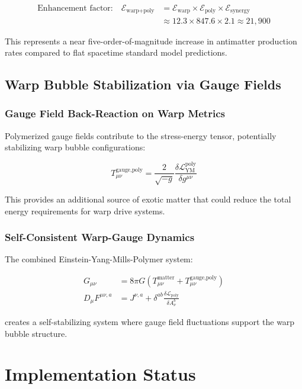 \documentclass[11pt]{article}
\begin{document}
\begin{align}
\text{Enhancement factor:} \quad \mathcal{E}_{\text{warp+poly}} &= \mathcal{E}_{\text{warp}} \times \mathcal{E}_{\text{poly}} \times \mathcal{E}_{\text{synergy}} \\
&\approx 12.3 \times 847.6 \times 2.1 \approx 21,900
\end{align}

This represents a near five-order-of-magnitude increase in antimatter production rates compared to flat spacetime standard model predictions.

\subsection{Warp Bubble Stabilization via Gauge Fields}

\subsubsection{Gauge Field Back-Reaction on Warp Metrics}
Polymerized gauge fields contribute to the stress-energy tensor, potentially stabilizing warp bubble configurations:

\begin{equation}
T_{\mu\nu}^{\text{gauge,poly}} = \frac{2}{\sqrt{-g}} \frac{\delta \mathcal{L}_{\text{YM}}^{\text{poly}}}{\delta g^{\mu\nu}}
\end{equation}

This provides an additional source of exotic matter that could reduce the total energy requirements for warp drive systems.

\subsubsection{Self-Consistent Warp-Gauge Dynamics}
The combined Einstein-Yang-Mills-Polymer system:

\begin{align}
G_{\mu\nu} &= 8\pi G \left(T_{\mu\nu}^{\text{matter}} + T_{\mu\nu}^{\text{gauge,poly}}\right) \\
D_\mu F^{\mu\nu,a} &= J^{\nu,a} + \delta^{ab} \frac{\delta \mathcal{L}_{\text{poly}}}{\delta A_\nu^b}
\end{align}

creates a self-stabilizing system where gauge field fluctuations support the warp bubble structure.

\section{Implementation Status}
\end{document}
